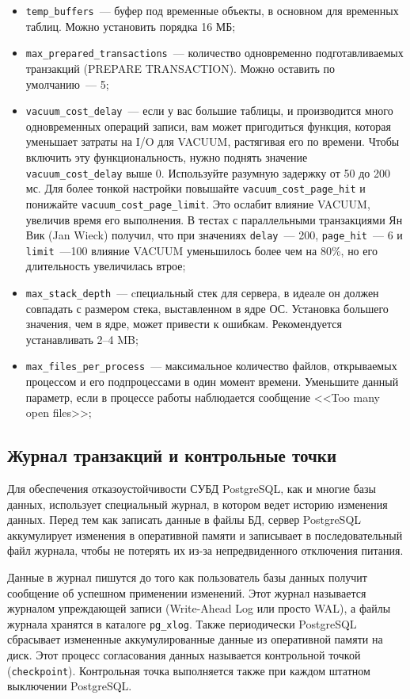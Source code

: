 \begin{itemize}
  \item \lstinline!temp_buffers!~--- буфер под временные объекты, в основном для временных таблиц. Можно установить порядка 16 МБ;
  \item \lstinline!max_prepared_transactions!~--- количество одновременно подготавливаемых транзакций (PREPARE TRANSACTION). Можно оставить по умолчанию~--- 5;
  \item \lstinline!vacuum_cost_delay!~--- если у вас большие таблицы, и производится много одновременных операций записи, вам может пригодиться функция, которая уменьшает затраты на I/O для VACUUM, растягивая его по времени. Чтобы включить эту функциональность, нужно поднять значение \lstinline!vacuum_cost_delay! выше 0. Используйте разумную задержку от 50 до 200 мс. Для более тонкой настройки повышайте \lstinline!vacuum_cost_page_hit! и понижайте \lstinline!vacuum_cost_page_limit!. Это ослабит влияние VACUUM, увеличив время его выполнения. В тестах с параллельными транзакциями Ян Вик (Jan Wieck) получил, что при значениях \lstinline!delay!~--- 200, \lstinline!page_hit!~--- 6 и \lstinline!limit!~---100 влияние VACUUM уменьшилось более чем на 80\%, но его длительность увеличилась втрое;
  \item \lstinline!max_stack_depth!~--- cпециальный стек для сервера, в идеале он должен совпадать с размером стека, выставленном в ядре ОС. Установка большего значения, чем в ядре, может привести к ошибкам. Рекомендуется устанавливать 2--4 MB;
  \item \lstinline!max_files_per_process!~--- максимальное количество файлов, открываемых процессом и его подпроцессами в один момент времени. Уменьшите данный параметр, если в процессе работы наблюдается сообщение <<Too many open files>>;
\end{itemize}


\subsection{Журнал транзакций и контрольные точки}


Для обеспечения отказоустойчивости СУБД PostgreSQL, как и многие базы данных, использует специальный журнал, в котором ведет историю изменения данных. Перед тем как записать данные в файлы БД, сервер PostgreSQL аккумулирует изменения в оперативной памяти и записывает в последовательный файл журнала, чтобы не потерять их из-за непредвиденного отключения питания.

Данные в журнал пишутся до того как пользователь базы данных получит сообщение об успешном применении изменений. Этот журнал называется журналом упреждающей записи (Write-Ahead Log или просто WAL), а файлы журнала хранятся в каталоге \lstinline!pg_xlog!. Также периодически PostgreSQL сбрасывает измененные аккумулированные данные из оперативной памяти на диск. Этот процесс согласования данных называется контрольной точкой (\lstinline!checkpoint!). Контрольная точка выполняется также при каждом штатном выключении PostgreSQL.

